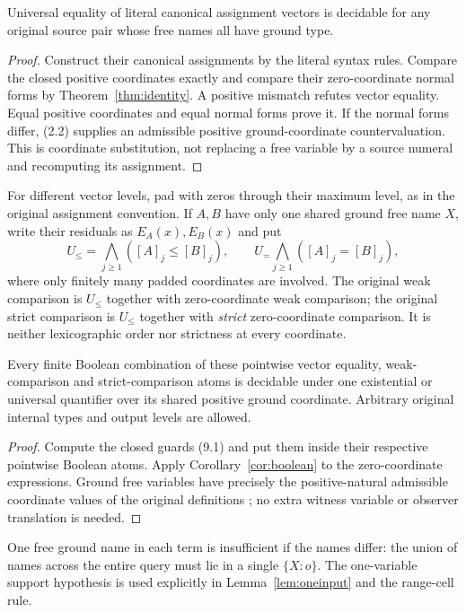 \documentclass[11pt,a4paper]{article}
\begin{document}
\begin{corollary}\label{cor:sourceeq}
Universal equality of literal canonical assignment vectors is decidable
for any original source pair whose free names all have ground type.
\end{corollary}
\begin{proof}
Construct their canonical assignments by the literal syntax rules. Compare
the closed positive coordinates exactly and compare their zero-coordinate
normal forms by Theorem~\ref{thm:identity}. A positive mismatch refutes
vector equality. Equal positive coordinates and equal normal forms prove
it. If the normal forms differ, (2.2) supplies an admissible positive
ground-coordinate countervaluation. This is coordinate substitution, not
replacing a free variable by a source numeral and recomputing its assignment.
\end{proof}

For different vector levels, pad with zeros through their maximum level,
as in the original assignment convention. If $A,B$ have only one shared
ground free name $X$, write their residuals as $E_A(x),E_B(x)$ and put
\[
 U_{\le}=\bigwedge_{j\ge1}([A]_j\le[B]_j),\qquad
 U_=\bigwedge_{j\ge1}([A]_j=[B]_j),                 \tag{9.1}
\]
where only finitely many padded coordinates are involved. The original
weak comparison is $U_{\le}$ together with zero-coordinate weak comparison;
the original strict comparison is $U_{\le}$ together with \emph{strict}
zero-coordinate comparison. It is neither lexicographic order nor
strictness at every coordinate.

\begin{corollary}
Every finite Boolean combination of these pointwise vector equality,
weak-comparison and strict-comparison atoms is decidable under one
existential or universal quantifier over its shared positive ground
coordinate. Arbitrary original internal types and output levels are allowed.
\end{corollary}
\begin{proof}
Compute the closed guards (9.1) and put them inside their respective
pointwise Boolean atoms. Apply Corollary~\ref{cor:boolean} to the
zero-coordinate expressions. Ground free variables have precisely the
positive-natural admissible coordinate values of the original definitions
\cite[Definitions 2.5--2.8]{ww}; no extra witness variable or observer
translation is needed.
\end{proof}
One free ground name in each term is insufficient if the names differ:
the union of names across the entire query must lie in a single
$\{X:o\}$. The one-variable support hypothesis is used explicitly in
Lemma~\ref{lem:oneinput} and the range-cell rule.
\end{document}

